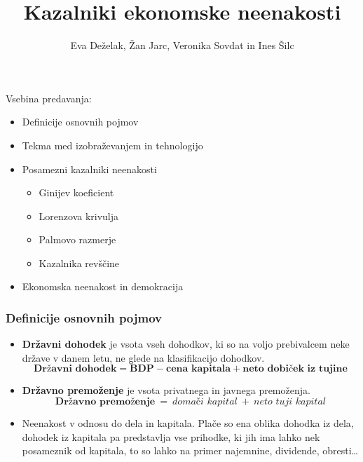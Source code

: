 \documentclass[10pt]{beamer}
\begin{document}
\title[Kazalniki ekonomske neenakosti]{Kazalniki ekonomske neenakosti}
\author{Eva Deželak, Žan Jarc, Veronika Sovdat in Ines Šilc}

\begin{frame}
	\titlepage
\end {frame}

\begin{frame}
Vsebina predavanja:
	\begin{itemize}
		\item Definicije osnovnih pojmov
		\item Tekma med izobraževanjem in tehnologijo
		\item Posamezni kazalniki neenakosti
			\begin{itemize}
				\item Ginijev koeficient
				\item Lorenzova krivulja
				\item Palmovo razmerje
				\item Kazalnika revščine
			\end{itemize}
		\item Ekonomska neenakost in demokracija
	\end{itemize}
\end {frame}

\begin{frame}
\frametitle{Definicije osnovnih pojmov}
\begin{itemize}
\item \textbf{Državni dohodek} je vsota vseh dohodkov, ki so na voljo prebivalcem neke države v danem letu, ne glede na klasifikacijo dohodkov.
$$
\textbf{Državni dohodek} = \textbf{BDP} - \textbf{cena kapitala} + \textbf{neto dobiček iz tujine}
$$
\item \textbf{Državno premoženje} je vsota privatnega in javnega premoženja.
$$
\textbf{Državno premoženje}~=~\textit{domači kapital}~+~\textit{neto tuji kapital}
$$
\item Neenakost v odnosu do dela in kapitala. Plače so ena oblika dohodka iz dela, dohodek iz kapitala pa predstavlja vse prihodke, ki jih ima lahko nek posameznik od kapitala, to so lahko na primer najemnine, dividende, obresti\dots
\end{itemize}
\end{frame}
\end{document}
